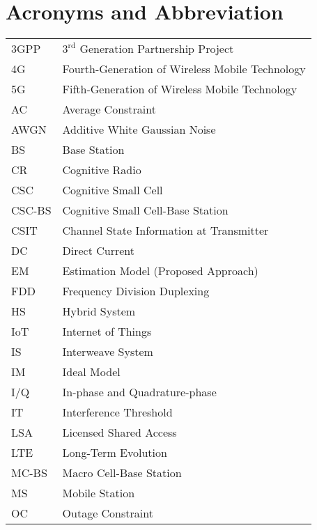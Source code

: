 
\chapter{Acronyms and Abbreviation}
\renewcommand{\arraystretch}{1.0}
\begin{longtable}{p{}p{}}

   	3GPP    &	$3^{\text{rd}}$ Generation Partnership Project \\
   	4G     &       Fourth-Generation of Wireless Mobile Technology\\	
   	5G     &       Fifth-Generation of Wireless Mobile Technology\\	
   	AC 	&	Average Constraint\\
   	AWGN	&	Additive White Gaussian Noise \\
	BS	&	Base Station \\
        CR 	&	Cognitive Radio \\
        CSC 	&	Cognitive Small Cell\\
	CSC-BS	&	Cognitive Small Cell-Base Station \\
	CSIT	&	Channel State Information at Transmitter \\
	DC 	&	Direct Current \\
  	EM	&	Estimation Model (Proposed Approach) \\
	FDD	& 	Frequency Division Duplexing \\
	HS	& 	Hybrid System \\
        IoT	& 	Internet of Things\\
	IS	& 	Interweave System \\
	IM	& 	Ideal Model \\
	I/Q	& 	In-phase and Quadrature-phase\\
	IT	& 	Interference Threshold \\
	LSA	& 	Licensed Shared Access \\
	LTE     & 	Long-Term Evolution \\
	MC-BS	&	Macro Cell-Base Station \\
	MS	&	Mobile Station \\
	OC	&	Outage Constraint \\

\end{longtable}
